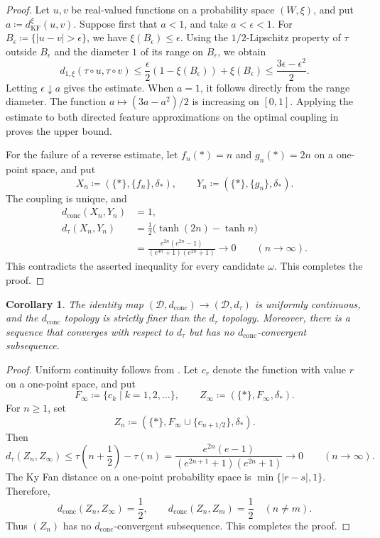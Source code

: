 \documentclass[11pt]{amsart}
\theoremstyle{plain}
\newtheorem{corollary}[theorem]{Corollary}
\theoremstyle{definition}
\theoremstyle{remark}
\newcommand{\D}{\mathcal D}
\newcommand{\dconc}{d_{\mathrm{conc}}}
\newcommand{\dtau}{d_{\tau}}
\newcommand{\kf}{d_{\operatorname{KF}}}
\begin{document}
\begin{proof}
Let $u,v$ be real-valued functions on a probability space $(W,\xi)$, and put $a\coloneqq\kf^\xi(u,v)$. Suppose first that $a<1$, and take $a<\epsilon<1$. For $B_\epsilon\coloneqq\{|u-v|>\epsilon\}$, we have $\xi(B_\epsilon)\leq\epsilon$. Using the $1/2$-Lipschitz property of $\tau$ outside $B_\epsilon$ and the diameter $1$ of its range on $B_\epsilon$, we obtain
\[
d_{1,\xi}(\tau\circ u,\tau\circ v)
\leq\frac{\epsilon}{2}(1-\xi(B_\epsilon))+\xi(B_\epsilon)
\leq\frac{3\epsilon-\epsilon^2}{2}.
\]
Letting $\epsilon\downarrow a$ gives the estimate. When $a=1$, it follows directly from the range diameter. The function $a\mapsto(3a-a^2)/2$ is increasing on $[0,1]$. Applying the estimate to both directed feature approximations on the optimal coupling in  proves the upper bound.

For the failure of a reverse estimate, let $f_n(*)=n$ and $g_n(*)=2n$ on a one-point space, and put
\[
X_n\coloneqq(\{*\},\{f_n\},\delta_*),\qquad
Y_n\coloneqq(\{*\},\{g_n\},\delta_*).
\]
The coupling is unique, and
\[
\begin{aligned}
\dconc(X_n,Y_n)&=1,\\
\dtau(X_n,Y_n)
&=\frac12\bigl(\tanh(2n)-\tanh n\bigr)\\
&=\frac{e^{2n}(e^{2n}-1)}{(e^{4n}+1)(e^{2n}+1)}
\longrightarrow0
\qquad(n\to\infty).
\end{aligned}
\]
This contradicts the asserted inequality for every candidate $\omega$. This completes the proof.
\end{proof}

\begin{corollary}
\label{cor:full-topologies}
The identity map $(\D,\dconc)\to(\D,\dtau)$ is uniformly continuous, and the $\dconc$ topology is strictly finer than the $\dtau$ topology. Moreover, there is a sequence that converges with respect to $\dtau$ but has no $\dconc$-convergent subsequence.
\end{corollary}

\begin{proof}
Uniform continuity follows from . Let $c_r$ denote the function with value $r$ on a one-point space, and put
\[
F_\infty\coloneqq\{c_k\mid k=1,2,\ldots\},\qquad
Z_\infty\coloneqq(\{*\},F_\infty,\delta_*).
\]
For $n\geq1$, set
\[
Z_n\coloneqq(\{*\},F_\infty\cup\{c_{n+1/2}\},\delta_*).
\]
Then
\[
\dtau(Z_n,Z_\infty)
\leq\tau\left(n+\frac12\right)-\tau(n)
=\frac{e^{2n}(e-1)}{(e^{2n+1}+1)(e^{2n}+1)}
\longrightarrow0
\qquad(n\to\infty).
\]
The Ky Fan distance on a one-point probability space is $\min\{|r-s|,1\}$. Therefore,
\[
\dconc(Z_n,Z_\infty)=\frac12,
\qquad
\dconc(Z_n,Z_m)=\frac12\quad(n\neq m).
\]
Thus $(Z_n)$ has no $\dconc$-convergent subsequence. This completes the proof.
\end{proof}
\end{document}
